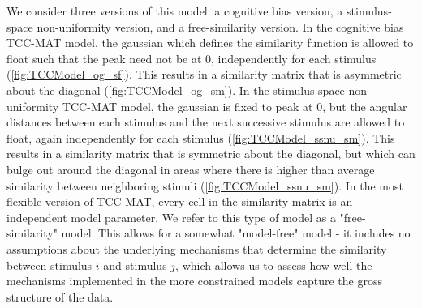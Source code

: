 We consider three versions of this model: a cognitive bias version, a stimulus-space non-uniformity version, and a free-similarity version.
In the cognitive bias TCC-MAT model, the gaussian which defines the similarity function is allowed to float such that the peak need not be at 0, independently for each stimulus (\autoref{fig:TCCModel_og_sf}).
This results in a similarity matrix that is asymmetric about the diagonal (\autoref{fig:TCCModel_og_sm}).
In the stimulus-space non-uniformity TCC-MAT model, the gaussian is fixed to peak at 0, but the angular distances between each stimulus and the next successive stimulus are allowed to float, again independently for each stimulus (\autoref{fig:TCCModel_ssnu_sm}). 
This results in a similarity matrix that is symmetric about the diagonal, but which can bulge out around the diagonal in areas where there is higher than average similarity between neighboring stimuli (\autoref{fig:TCCModel_ssnu_sm}).
In the most flexible version of TCC-MAT, every cell in the similarity matrix is an independent model parameter.
We refer to this type of model as a "free-similarity" model.
This allows for a somewhat "model-free" model - it includes no assumptions about the underlying mechanisms that determine the similarity between stimulus $i$ and stimulus $j$, which allows us to assess how well the mechanisms implemented in the more constrained models capture the gross structure of the data.

